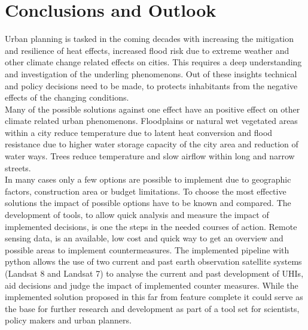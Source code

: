 \documentclass[a4paper, english]{article}
\begin{document}
\section{Conclusions and Outlook}\label{sec:conclusio}
%
Urban planning is tasked in the coming decades with increasing the mitigation and resilience of heat effects, increased flood risk due to extreme weather and other climate change related effects on cities. 
This requires a deep understanding and investigation of the underling phenomenons. 
Out of these insights technical and policy decisions need to be made, to protects inhabitants from the negative effects of the changing conditions. \\
%
Many of the possible solutions against one effect have an positive effect on other climate related urban phenomenons.
Floodplains or natural wet vegetated areas within a city reduce temperature due to latent heat conversion and flood resistance due to higher water storage capacity of the city area and reduction of water ways. Trees reduce temperature and slow airflow within long and narrow streets.\\ 
In many cases only a few options are possible to implement due to geographic factors, construction area or budget limitations. 
To choose the most effective solutions the impact of possible options have to be known and compared. 
The development of tools, to allow quick analysis and measure the impact of implemented decisions, is one the steps in the needed courses of action.
Remote sensing data, is an available, low cost and quick way to get an overview and possible areas to implement countermeasures. 
The implemented pipeline with python allows the use of two current and past earth observation satellite systems (Landsat 8 and Landsat 7) to analyse the current and past development of \acp{UHI}, aid decisions and judge the impact of implemented counter measures.
While the implemented solution proposed in this far from feature complete it could serve as the base for further research and development as part of a tool set for scientists, policy makers and urban planners. 
\newpage
\printbibliography
\end{document}
